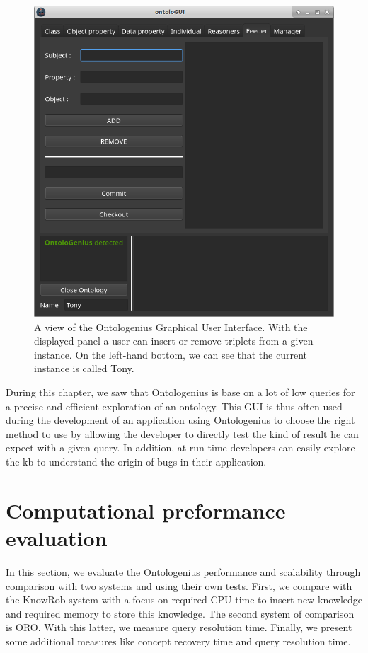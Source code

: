 \begin{figure}[ht!]
\centering
\includegraphics[scale=0.5]{figures/chapter2/ontologui.png}
\caption{\label{fig:chap2_ontologui} A view of the Ontologenius Graphical User Interface. With the displayed panel a user can insert or remove triplets from a given instance. On the left-hand bottom, we can see that the current instance is called Tony.}
\end{figure}

During this chapter, we saw that Ontologenius is base on a lot of low queries for a precise and efficient exploration of an ontology. This GUI is thus often used during the development of an application using Ontologenius to choose the right method to use by allowing the developer to directly test the kind of result he can expect with a given query. In addition, at run-time developers can easily explore the \acrshort{kb} to understand the origin of bugs in their application.

\section{Computational preformance evaluation}

In this section, we evaluate the Ontologenius performance and scalability through comparison with two systems and using their own tests. First, we compare with the KnowRob system with a focus on required CPU time to insert new knowledge and required memory to store this knowledge. The second system of comparison is ORO. With this latter, we measure query resolution time. Finally, we present some additional measures like concept recovery time and \sparql{} query resolution time.

